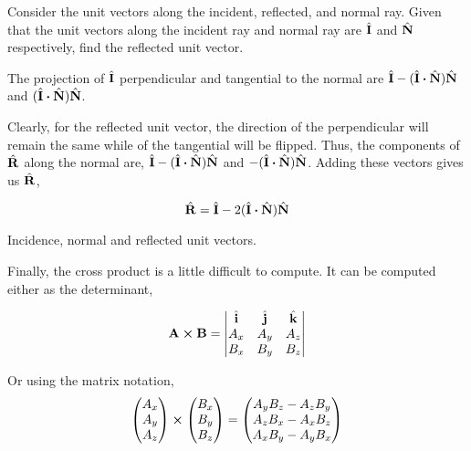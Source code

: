 \begin{example}
    Consider the unit vectors along the incident, reflected, and normal ray.
    Given that the unit vectors along the incident ray and normal ray are 
    \(\hat{\boldsymbol{\mathbf{I}}}\) and \(\hat{\boldsymbol{\mathbf{N}}}\) respectively, find the reflected unit vector.
    
    \begin{soln}
        The projection of \(\hat{\boldsymbol{\mathbf{I}}}\) perpendicular and tangential to the 
        normal are \(\unitv{I} - (\unitv{I} \dtp \unitv{N})\unitv{N}\) and \((\unitv{I} \dtp \unitv{N})\unitv{N}\).

        Clearly, for the reflected unit vector, the direction of the perpendicular will remain the same 
        while of the tangential will be flipped. Thus, the components of 
        \(\hat{\boldsymbol{\mathbf{R}}}\) along the normal are, \(\unitv{I} - (\unitv{I} \dtp \unitv{N})\unitv{N}\)
        and \(-(\unitv{I} \dtp \unitv{N})\unitv{N}\). Adding these vectors gives us \(\hat{\boldsymbol{\mathbf{R}}}\),

        \begin{equation*}
            \unitv{R} = \unitv{I} - 2(\unitv{I} \dtp \unitv{N})\unitv{N}
        \end{equation*}
    \end{soln}
\end{example}

\begin{marginfigure}
    \centering
    \caption{Incidence, normal and reflected unit vectors.}
\end{marginfigure}


Finally, the cross product is a little difficult to compute.
It can be computed either as the determinant,

\[\Aa \cp \BB =
\begin{vmatrix}
    \unitv{i} & \unitv{j} & \unitv{k} \\
    A_x & A_y & A_z \\
    B_x & B_y & B_z
\end{vmatrix}\]

Or using the matrix notation,
\[
\begin{pmatrix}
    A_x \\
    A_y \\
    A_z
\end{pmatrix} \cp
%
\begin{pmatrix}
    B_x \\
    B_y \\
    B_z
\end{pmatrix}
%
=
%
\begin{pmatrix}
    A_yB_z - A_zB_y \\
    A_zB_x - A_xB_z \\
    A_xB_y - A_yB_x
\end{pmatrix}
\]

